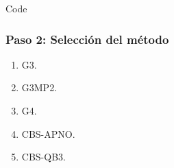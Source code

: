 \documentclass{beamer}
\begin{document}
\begin{frame}[fragile]{Code}
\frametitle{Paso 2: Selección del método}

\begin{enumerate}		
	\item G3. 
	\item G3MP2.
	\item G4.	
	\item CBS-APNO.
	\item CBS-QB3.
\end{enumerate}
\end{frame}

\end{document}

